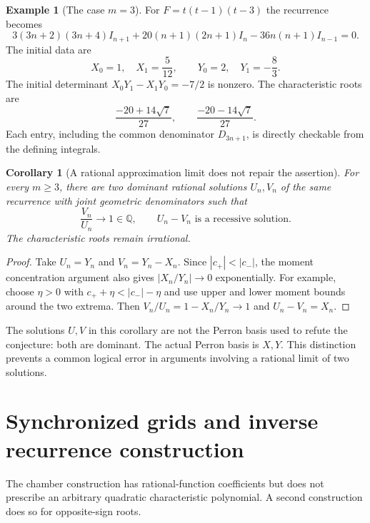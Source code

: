 \documentclass[11pt,a4paper]{article}
\newtheorem{corollary}[theorem]{Corollary}
\theoremstyle{definition}\newtheorem{definition}[theorem]{Definition}
\newtheorem{example}[theorem]{Example}
\theoremstyle{remark}\newtheorem{remark}[theorem]{Remark}
\newcommand{\Q}{\mathbb Q}\newcommand{\Z}{\mathbb Z}\newcommand{\N}{\mathbb N}\newcommand{\R}{\mathbb R}\newcommand{\C}{\mathbb C}
\begin{document}
\begin{example}[The case $m=3$]
For $F=t(t-1)(t-3)$ the recurrence becomes
\begin{equation}\label{eq:m3}
 3(3n+2)(3n+4)I_{n+1}
 +20(n+1)(2n+1)I_n
 -36n(n+1)I_{n-1}=0.
\end{equation}
The initial data are
\[
 X_0=1,\quad X_1=\frac5{12},\qquad
 Y_0=2,\quad Y_1=-\frac83.
\]
The initial determinant $X_0Y_1-X_1Y_0=-7/2$ is nonzero. The characteristic roots are
\[
 \frac{-20+14\sqrt7}{27},\qquad
 \frac{-20-14\sqrt7}{27}.
\]
Each entry, including the common denominator $D_{3n+1}$, is directly checkable from the defining integrals.
\end{example}

\begin{corollary}[A rational approximation limit does not repair the assertion]\label{cor:apery}
For every $m\ge3$, there are two dominant rational solutions $U_n,V_n$ of the same recurrence with joint geometric denominators such that
\[
 \frac{V_n}{U_n}\longrightarrow1\in\Q,
 \qquad U_n-V_n\text{ is a recessive solution}.
\]
The characteristic roots remain irrational.
\end{corollary}
\begin{proof}
Take $U_n=Y_n$ and $V_n=Y_n-X_n$. Since $|c_+|<|c_-|$, the moment concentration argument also gives $|X_n/Y_n|\to0$ exponentially. For example, choose $\eta>0$ with $c_++\eta<|c_-|-\eta$ and use upper and lower moment bounds around the two extrema. Then $V_n/U_n=1-X_n/Y_n\to1$ and $U_n-V_n=X_n$.
\end{proof}

The solutions $U,V$ in this corollary are not the Perron basis used to refute the conjecture: both are dominant. The actual Perron basis is $X,Y$. This distinction prevents a common logical error in arguments involving a rational limit of two solutions.

\section{Synchronized grids and inverse recurrence construction}\label{sec:floor}
The chamber construction has rational-function coefficients but does not prescribe an arbitrary quadratic characteristic polynomial. A second construction does so for opposite-sign roots.
\end{document}
